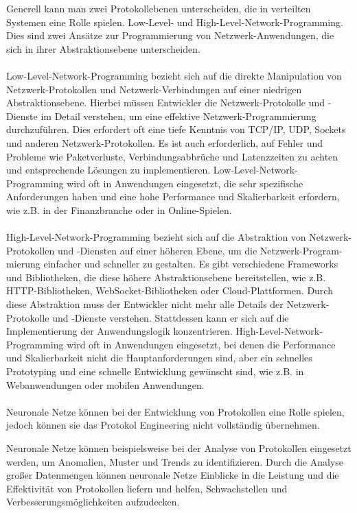Generell kann man zwei Protokollebenen unterscheiden, die in verteilten Systemen eine Rolle spielen. Low-Level- und High-Level-Network-Programming. Dies sind zwei Ansätze zur Programmierung von Netzwerk-Anwendungen, die sich in ihrer Abstraktionsebene unterscheiden.
\\\\
Low-Level-Network-Programming bezieht sich auf die direkte Manipulation von Netzwerk-Protokollen und Netzwerk-Verbindungen auf einer niedrigen Abstraktionsebene. Hierbei müssen Entwickler die Netzwerk-Protokolle und -Dienste im Detail verstehen, um eine effektive Netzwerk-Programmierung durchzuführen. Dies erfordert oft eine tiefe Kenntnis von TCP/IP, UDP, Sockets und anderen Netzwerk-Protokollen. Es ist auch erforderlich, auf Fehler und Probleme wie Paketverluste, Verbindungsabbrüche und Latenzzeiten zu achten und entsprechende Lösungen zu implementieren. Low-Level-Network-Programming wird oft in Anwendungen eingesetzt, die sehr spezifische Anforderungen haben und eine hohe Performance und Skalierbarkeit erfordern, wie z.B. in der Finanzbranche oder in Online-Spielen.
\\\\
High-Level-Network-Programming bezieht sich auf die Abstraktion von Netzwerk-Protokollen und -Diensten auf einer höheren Ebene, um die Netzwerk-Program-mierung einfacher und schneller zu gestalten. Es gibt verschiedene Frameworks und Bibliotheken, die diese höhere Abstraktionsebene bereitstellen, wie z.B. HTTP-Bibliotheken, WebSocket-Bibliotheken oder Cloud-Plattformen. Durch diese Abstraktion muss der Entwickler nicht mehr alle Details der Netzwerk-Protokolle und -Dienste verstehen. Stattdessen kann er sich auf die Implementierung der Anwendungslogik konzentrieren. High-Level-Network-Programming wird oft in Anwendungen eingesetzt, bei denen die Performance und Skalierbarkeit nicht die Hauptanforderungen sind, aber ein schnelles Prototyping und eine schnelle Entwicklung gewünscht sind, wie z.B. in Webanwendungen oder mobilen Anwendungen.    
\\\\
Neuronale Netze können bei der Entwicklung von Protokollen eine Rolle spielen, jedoch können sie das Protokol Engineering nicht vollständig übernehmen.

Neuronale Netze können beispielsweise bei der Analyse von Protokollen eingesetzt werden, um Anomalien, Muster und Trends zu identifizieren. Durch die Analyse großer Datenmengen können neuronale Netze Einblicke in die Leistung und die Effektivität von Protokollen liefern und helfen, Schwachstellen und Verbesserungsmöglichkeiten aufzudecken.

